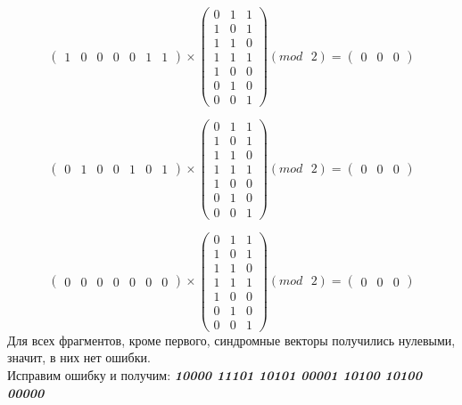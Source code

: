 \documentclass[a5paper, 10pt]{article}
\theoremstyle{definition}
\theoremstyle{plain}
\theoremstyle{remark}
\begin{document}
\begin{equation}
\begin{pmatrix}
1 & 0 & 0 & 0 & 0 & 1 & 1
\end{pmatrix}
 \times
\begin{pmatrix}
0 & 1 & 1\\
1 & 0 & 1\\
1 & 1 & 0\\
1 & 1 & 1 \\
1 & 0 & 0\\
0 & 1 & 0 \\
0 & 0 & 1
\end{pmatrix}
(mod \text{ }2)
= \begin{pmatrix}
0 & 0 & 0 
\end{pmatrix}
\end{equation}

\begin{equation}
\begin{pmatrix}
0 & 1 & 0 & 0 & 1 & 0 & 1
\end{pmatrix}
 \times
\begin{pmatrix}
0 & 1 & 1\\
1 & 0 & 1\\
1 & 1 & 0\\
1 & 1 & 1 \\
1 & 0 & 0\\
0 & 1 & 0 \\
0 & 0 & 1
\end{pmatrix}
(mod \text{ }2)
= \begin{pmatrix}
0 & 0 & 0 
\end{pmatrix}
\end{equation}

\begin{equation}
\begin{pmatrix}
0 & 0 & 0 & 0 & 0 & 0 & 0
\end{pmatrix}
 \times
\begin{pmatrix}
0 & 1 & 1\\
1 & 0 & 1\\
1 & 1 & 0\\
1 & 1 & 1 \\
1 & 0 & 0\\
0 & 1 & 0 \\
0 & 0 & 1
\end{pmatrix}
(mod \text{ }2)
= \begin{pmatrix}
0 & 0 & 0 
\end{pmatrix}
\end{equation}
Для всех фрагментов, кроме первого, синдромные векторы получились нулевыми, значит, в них нет ошибки. \\
Исправим ошибку и получим:  \textbf{\textit{10000 11101 10101 00001 10100 10100 00000}}
\end{document}
